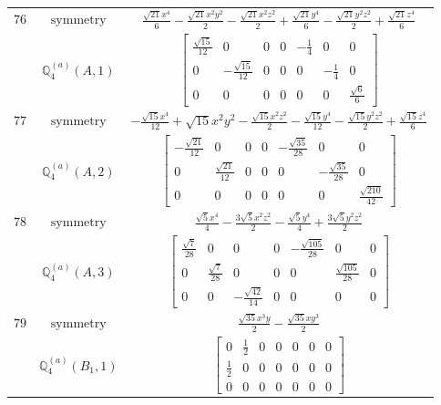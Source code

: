 \documentclass[fleqn,8pt,landscape]{jsarticle}
\begin{document}
\begin{longtable}{ccc}
$ 76 $ & $ \text{symmetry} $ & $ \frac{\sqrt{21} x^{4}}{6} - \frac{\sqrt{21} x^{2} y^{2}}{2} - \frac{\sqrt{21} x^{2} z^{2}}{2} + \frac{\sqrt{21} y^{4}}{6} - \frac{\sqrt{21} y^{2} z^{2}}{2} + \frac{\sqrt{21} z^{4}}{6} $ \\
$  $ & $ \mathbb{Q}_{4}^{(a)}(A,1) $ & $ \begin{bmatrix} \frac{\sqrt{15}}{12} & 0 & 0 & 0 & - \frac{1}{4} & 0 & 0 \\ 0 & - \frac{\sqrt{15}}{12} & 0 & 0 & 0 & - \frac{1}{4} & 0 \\ 0 & 0 & 0 & 0 & 0 & 0 & \frac{\sqrt{6}}{6} \end{bmatrix} $ \\ \hline
$ 77 $ & $ \text{symmetry} $ & $ - \frac{\sqrt{15} x^{4}}{12} + \sqrt{15} x^{2} y^{2} - \frac{\sqrt{15} x^{2} z^{2}}{2} - \frac{\sqrt{15} y^{4}}{12} - \frac{\sqrt{15} y^{2} z^{2}}{2} + \frac{\sqrt{15} z^{4}}{6} $ \\
$  $ & $ \mathbb{Q}_{4}^{(a)}(A,2) $ & $ \begin{bmatrix} - \frac{\sqrt{21}}{12} & 0 & 0 & 0 & - \frac{\sqrt{35}}{28} & 0 & 0 \\ 0 & \frac{\sqrt{21}}{12} & 0 & 0 & 0 & - \frac{\sqrt{35}}{28} & 0 \\ 0 & 0 & 0 & 0 & 0 & 0 & \frac{\sqrt{210}}{42} \end{bmatrix} $ \\ \hline
$ 78 $ & $ \text{symmetry} $ & $ \frac{\sqrt{5} x^{4}}{4} - \frac{3 \sqrt{5} x^{2} z^{2}}{2} - \frac{\sqrt{5} y^{4}}{4} + \frac{3 \sqrt{5} y^{2} z^{2}}{2} $ \\
$  $ & $ \mathbb{Q}_{4}^{(a)}(A,3) $ & $ \begin{bmatrix} \frac{\sqrt{7}}{28} & 0 & 0 & 0 & - \frac{\sqrt{105}}{28} & 0 & 0 \\ 0 & \frac{\sqrt{7}}{28} & 0 & 0 & 0 & \frac{\sqrt{105}}{28} & 0 \\ 0 & 0 & - \frac{\sqrt{42}}{14} & 0 & 0 & 0 & 0 \end{bmatrix} $ \\ \hline
$ 79 $ & $ \text{symmetry} $ & $ \frac{\sqrt{35} x^{3} y}{2} - \frac{\sqrt{35} x y^{3}}{2} $ \\
$  $ & $ \mathbb{Q}_{4}^{(a)}(B_{1},1) $ & $ \begin{bmatrix} 0 & \frac{1}{2} & 0 & 0 & 0 & 0 & 0 \\ \frac{1}{2} & 0 & 0 & 0 & 0 & 0 & 0 \\ 0 & 0 & 0 & 0 & 0 & 0 & 0 \end{bmatrix} $ \\ \hline

\end{longtable}
\end{document}
